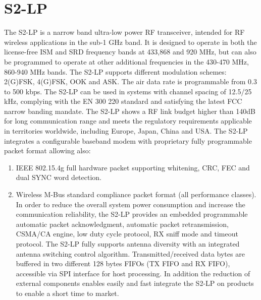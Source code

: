 \section{S2-LP}
The S2-LP is a narrow band ultra-low power RF transceiver, intended for RF wireless applications in the sub-1 GHz band. It is designed to operate in both the license-free ISM and SRD frequency bands at 433,868 and 920 MHz, but can also be programmed to operate at other additional frequencies in the 430-470 MHz, 860-940 MHz bands. The S2-LP supports different modulation schemes: 2(G)FSK, 4(G)FSK, OOK and ASK. The air data rate is programmable from 0.3 to 500 kbps. The S2-LP can be used in systems with channel spacing of 12.5/25 kHz, complying with the EN 300 220 standard and satisfying the latest FCC narrow banding mandate.
The S2-LP shows a RF link budget higher than 140dB for long communication range and meets the regulatory requirements applicable in territories worldwide, including Europe, Japan, China and USA. The S2-LP integrates a configurable baseband modem with proprietary fully programmable packet format allowing also:
\begin{enumerate}
	\item{IEEE 802.15.4g full hardware packet supporting whitening, CRC, FEC and dual SYNC
	word detection.}
	\item{Wireless M-Bus standard compliance packet format (all performance classes).
	In order to reduce the overall system power consumption and increase the communication reliability, the S2-LP provides an embedded programmable automatic packet acknowledgment, automatic packet retransmission, CSMA/CA engine, low duty cycle protocol, RX sniff mode and timeout protocol. The S2-LP fully supports antenna diversity with an integrated antenna switching control algorithm. Transmitted/received data bytes are buffered in two different 128 bytes FIFOs (TX FIFO and RX FIFO), accessible via SPI interface for host processing. In addition the reduction of external components enables easily and fast integrate the S2-LP on products to enable a short time to market.}
\end{enumerate}
